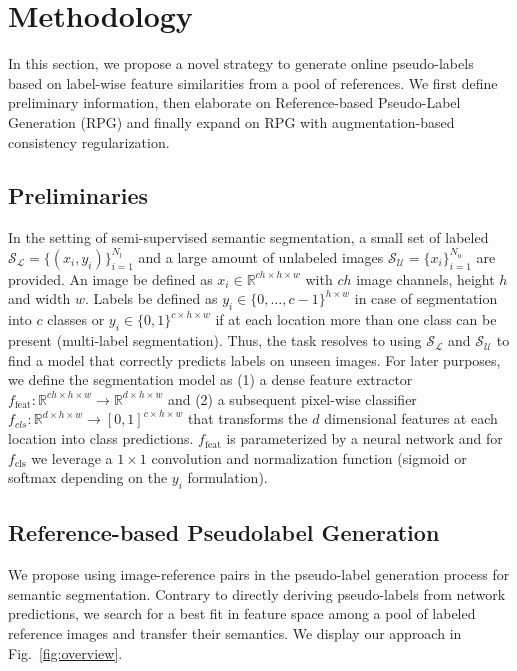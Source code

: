 \documentclass[letterpaper]{article} %
\begin{document}
\section{Methodology}
In this section, we propose a novel strategy to generate online pseudo-labels based on label-wise feature similarities from a pool of references. We first define preliminary information, then elaborate on Reference-based Pseudo-Label Generation (RPG) and finally expand on RPG with augmentation-based consistency regularization.
\subsection{Preliminaries}
In the setting of semi-supervised semantic segmentation, a small set of labeled $\mathcal{S_L} = \{(x_i,y_i)\}^{N_l}_{i=1}$ and a large amount of unlabeled images $\mathcal{S_U} = \{x_i\}^{N_u}_{i=1}$ are provided. An image be defined as $x_i \in \mathbb{R}^{ch\times h\times w}$ with $ch$ image channels, height $h$ and width $w$.
Labels be defined as $y_i\in \{0,\dots,c-1\}^{h\times w}$ in case of segmentation into $c$ classes or $y_i\in \{0,1\}^{c\times h\times w}$ if at each location more than one class can be present (multi-label segmentation).
Thus, the task resolves to using $\mathcal{S_L}$ and $\mathcal{S_U}$ to find a model that correctly predicts labels on unseen images.
For later purposes, we define the segmentation model as (1) a dense feature extractor $f_{\text{feat}}:\mathbb{R}^{ch\times h\times w} \rightarrow \mathbb{R}^{d\times h\times w}$ and (2) a subsequent pixel-wise classifier $f_{{cls}}:\mathbb{R}^{d \times h\times w} \rightarrow [0,1]^{c\times h\times w}$ that transforms the $d$ dimensional features at each location into class predictions.
$f_{{\text{feat}}}$ is parameterized by a neural network and for $f_{{\text{cls}}}$ we leverage a $1\times1$ convolution and normalization function (sigmoid or softmax depending on the $y_i$ formulation).

\subsection{Reference-based Pseudolabel Generation}
We propose using image-reference pairs in the pseudo-label generation process for semantic segmentation.
Contrary to directly deriving pseudo-labels from network predictions, we search for a best fit in feature space among a pool of labeled reference images and transfer their semantics.
We display our approach in Fig.~\ref{fig:overview}.
\end{document}
